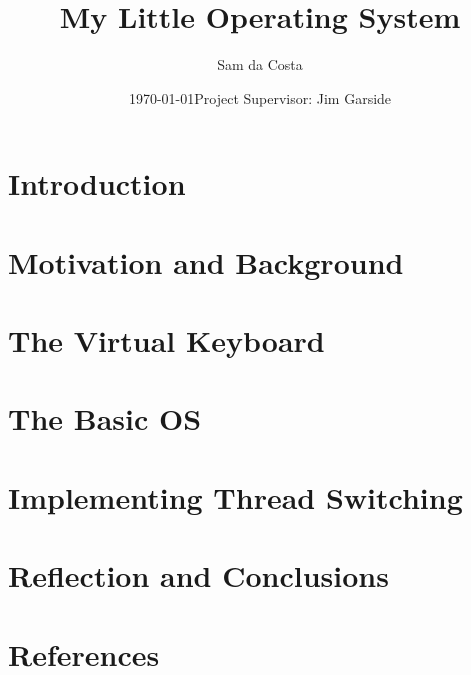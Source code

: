 \documentclass[11pt]{article}
\title{ My Little Operating System }
\author{ Sam da Costa }
\date{\today \endgraf \bigskip Project Supervisor: Jim Garside}
\begin{document}
\maketitle	
\pagebreak


\tableofcontents
\pagebreak


\section{Introduction}

\pagebreak
\section{Motivation and Background}

\pagebreak
\section{The Virtual Keyboard}

\pagebreak
\section{The Basic OS}

\pagebreak
\section{Implementing Thread Switching}

\pagebreak
\section{Reflection and Conclusions}

\pagebreak
\section{References}

\pagebreak
\end{document}
